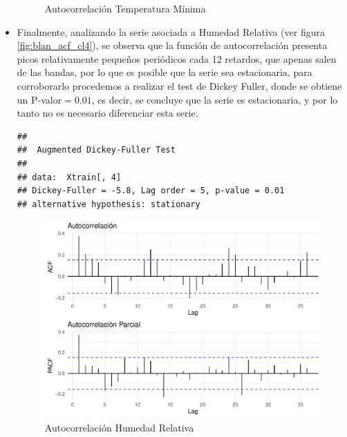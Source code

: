 \documentclass[12pt,oneside]{book}\usepackage[]{graphicx}\usepackage[]{color}
\makeatletter
\def\maxwidth{ %
  \ifdim\Gin@nat@width>\linewidth
    \linewidth
  \else
    \Gin@nat@width
  \fi
}
\newenvironment{kframe}{%
 \def\at@end@of@kframe{}%
 \ifinner\ifhmode%
  \def\at@end@of@kframe{\end{minipage}}%
  \begin{minipage}{\columnwidth}%
 \fi\fi%
 \def\FrameCommand##1{\hskip\@totalleftmargin \hskip-\fboxsep
 \colorbox{shadecolor}{##1}\hskip-\fboxsep
     \hskip-\linewidth \hskip-\@totalleftmargin \hskip\columnwidth}%
 \MakeFramed {\advance\hsize-\width
   \@totalleftmargin\z@ \linewidth\hsize
   \@setminipage}}%
 {\par\unskip\endMakeFramed%
 \at@end@of@kframe}
\newenvironment{knitrout}{}{} %
\theoremstyle{definition} %
\makeatother
\begin{document}
\begin{itemize}
\begin{knitrout}
\begin{figure}[H]
{}

\caption{\label{fig:blan_acf_cl3} Autocorrelación Temperatura Mínima}\label{fig:unnamed-chunk-28}
\end{figure}


\end{knitrout}


\item Finalmente, analizando la serie asociada a Humedad Relativa (ver figura \ref{fig:blan_acf_cl4}), se observa que la función de autocorrelación presenta picos relativamente pequeños periódicos cada 12 retardos, que apenas salen de las bandas, por lo que es posible que la serie sea estacionaria, para corroborarlo procedemos a realizar el test de Dickey Fuller, donde se obtiene un P-valor$=0.01$, es decir, se concluye que la serie es estacionaria, y por lo tanto no es necesario diferenciar esta serie.

\begin{knitrout}
\color{fgcolor}\begin{kframe}
\begin{verbatim}
## 
## 	Augmented Dickey-Fuller Test
## 
## data:  Xtrain[, 4]
## Dickey-Fuller = -5.8, Lag order = 5, p-value = 0.01
## alternative hypothesis: stationary
\end{verbatim}
\end{kframe}
\end{knitrout}


\begin{knitrout}
\color{fgcolor}\begin{figure}[H]

{\centering \includegraphics[width=\maxwidth]{figure/unnamed-chunk-30-1} 

}

\caption{\label{fig:blan_acf_cl4} Autocorrelación Humedad Relativa}\label{fig:unnamed-chunk-30}
\end{figure}


\end{knitrout}



\end{itemize}
\end{document}
